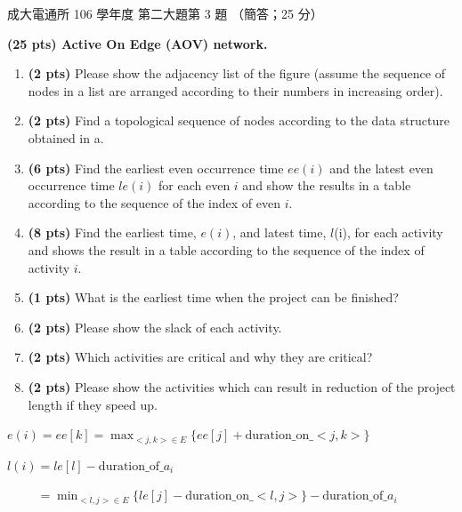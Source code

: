 \begin{pastexam}[label={px:ncku-106-cce-ds-07}]{成大電通所 106 學年度 第二大題第 3 題}
（簡答；25 分）

\textbf{(25 pts) Active On Edge (AOV) network.}
\begin{enumerate}[label=\alph*.]
\item \textbf{(2 pts)} Please show the adjacency list of the figure (assume the sequence of nodes in
a list are arranged according to their numbers in increasing order).
\item \textbf{(2 pts)} Find a topological sequence of nodes according to the data structure obtained
in a.
\item \textbf{(6 pts)} Find the earliest even occurrence time $ee(i)$ and the latest even occurrence
time $le(i)$ for each even $i$ and show the results in a table according to the sequence of the
index of even $i$.
\item \textbf{(8 pts)} Find the earliest time, $e(i)$, and latest time, $l$(i), for each activity and
shows the result in a table according to the sequence of the index of activity $i$.
\item \textbf{(1 pts)} What is the earliest time when the project can be finished?
\item \textbf{(2 pts)} Please show the slack of each activity.
\item \textbf{(2 pts)} Which activities are critical and why they are critical?
\item \textbf{(2 pts)} Please show the activities which can result in reduction of the project length
if they speed up.
\end{enumerate}

$e(i)=ee[k]=\max_{<j,k>\in E}\{ee[j]+\text{duration\_on\_}<j,k>\}$

$l(i)=le[l]-\text{duration\_of\_}a_i$

$\phantom{l(i)}=\min_{<l,j>\in E}\{le[j]-\text{duration\_on\_}<l,j>\}-\text{duration\_of\_}a_i$

\begin{center}
\end{center}
\end{pastexam}

